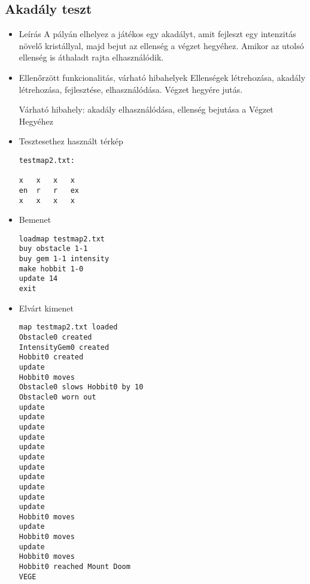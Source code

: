 \subsection{Akadály teszt}
\begin{itemize}
\item Leírás\newline
A pályán elhelyez a játékos egy akadályt, amit fejleszt egy intenzitás növelő kristállyal, majd bejut az ellenség a végzet hegyéhez. Amikor az utolsó ellenség is áthaladt rajta elhasználódik.
\item Ellenőrzött funkcionalitás, várható hibahelyek\newline
Ellenségek létrehozása, akadály létrehozása, fejlesztése, elhasználódása. Végzet hegyére jutás.

Várható hibahely: akadály elhasználódása, ellenség bejutása a Végzet Hegyéhez
\item Tesztesethez használt térkép \newline
\begin{lstlisting}
testmap2.txt:

x	x	x	x
en	r	r	ex
x	x	x	x
\end{lstlisting}
\item Bemenet\newline
\begin{lstlisting}
loadmap testmap2.txt
buy obstacle 1-1
buy gem 1-1 intensity
make hobbit 1-0
update 14
exit
\end{lstlisting}
\item Elvárt kimenet\newline
\begin{lstlisting}
map testmap2.txt loaded
Obstacle0 created
IntensityGem0 created
Hobbit0 created
update
Hobbit0 moves
Obstacle0 slows Hobbit0 by 10
Obstacle0 worn out
update
update
update
update
update
update
update
update
update
update
update
Hobbit0 moves
update
Hobbit0 moves
update
Hobbit0 moves
Hobbit0 reached Mount Doom
VEGE
\end{lstlisting}
\end{itemize}

